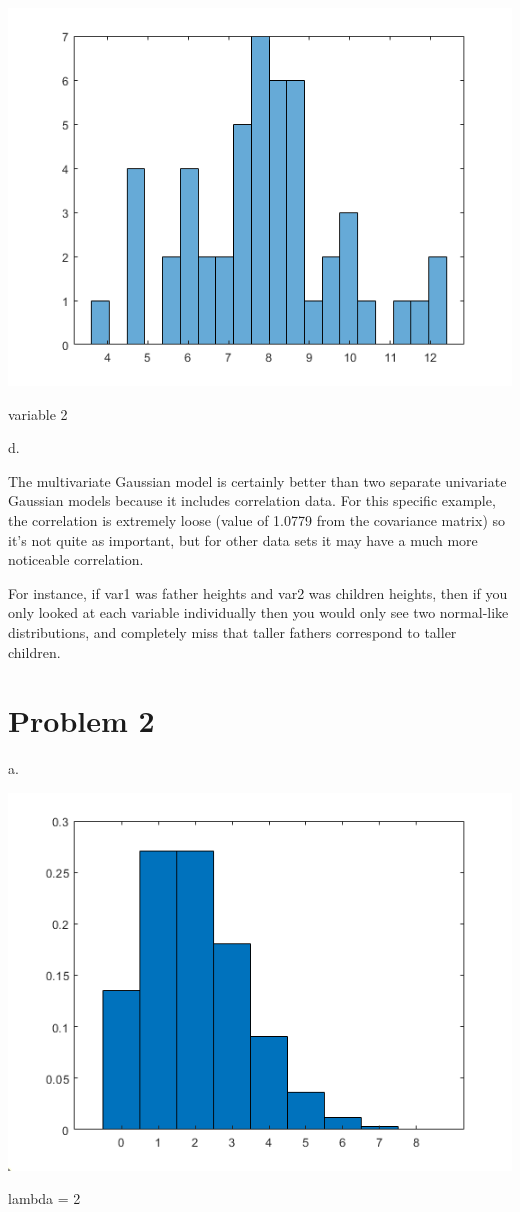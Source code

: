 \documentclass[a4paper]{article}
\begin{document}
\begin{center}
    \includegraphics[scale=1]{1c-2.png}
    \caption{variable 2}
\end{center}

\noindent
d. 

\noindent
The multivariate Gaussian model is certainly better than two separate univariate Gaussian models because it includes correlation data. For this specific example, the correlation is extremely loose (value of 1.0779 from the covariance matrix) so it's not quite as important, but for other data sets it may have a much more noticeable correlation.

\noindent
For instance, if var1 was father heights and var2 was children heights, then if you only looked at each variable individually then you would only see two normal-like distributions, and completely miss that taller fathers correspond to taller children.


\section{Problem 2}

\noindent
a.

\begin{center}
    \includegraphics[scale=1]{2a-1.png}
    \caption{lambda = 2}
\end{center}
\end{document}
